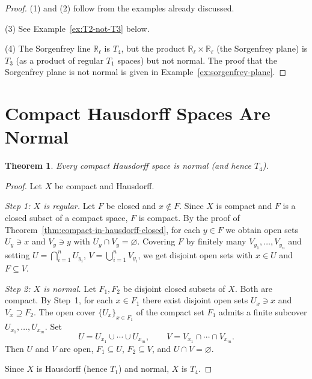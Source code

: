 \documentclass[11pt,a4paper,twoside]{book}
\newtheorem{theorem}{Theorem}[section]
\theoremstyle{remark}
\theoremstyle{definition}
\theoremstyle{definition}
\begin{document}
\begin{proof}
(1) and (2) follow from the examples already discussed.

(3) See Example~\ref{ex:T2-not-T3} below.

(4) The Sorgenfrey line $\mathbb{R}_\ell$ is $T_4$, but the product
$\mathbb{R}_\ell \times \mathbb{R}_\ell$ (the Sorgenfrey plane) is $T_3$
(as a product of regular $T_1$ spaces) but not normal.  The proof that the
Sorgenfrey plane is not normal is given in Example~\ref{ex:sorgenfrey-plane}.
\end{proof}

\section{Compact Hausdorff Spaces Are Normal}
\label{sec:compact-hausdorff-normal}

\begin{theorem}\label{thm:compact-hausdorff-normal}
Every compact Hausdorff space is normal (and hence $T_4$).
\end{theorem}

\begin{proof}
Let $X$ be compact and Hausdorff.

\emph{Step 1: $X$ is regular.}
Let $F$ be closed and $x \notin F$.  Since $X$ is compact and $F$ is a closed
subset of a compact space, $F$ is compact.  By the proof of
Theorem~\ref{thm:compact-in-hausdorff-closed}, for each $y \in F$ we obtain
open sets $U_y \ni x$ and $V_y \ni y$ with $U_y \cap V_y = \varnothing$.
Covering $F$ by finitely many $V_{y_1}, \ldots, V_{y_n}$ and setting
$U = \bigcap_{i=1}^n U_{y_i}$, $V = \bigcup_{i=1}^n V_{y_i}$, we get
disjoint open sets with $x \in U$ and $F \subseteq V$.

\emph{Step 2: $X$ is normal.}
Let $F_1, F_2$ be disjoint closed subsets of $X$.  Both are compact.  By
Step~1, for each $x \in F_1$ there exist disjoint open sets $U_x \ni x$ and
$V_x \supseteq F_2$.  The open cover $\{U_x\}_{x \in F_1}$ of the compact
set $F_1$ admits a finite subcover $U_{x_1}, \ldots, U_{x_m}$.  Set
\[
  U = U_{x_1} \cup \cdots \cup U_{x_m}, \qquad
  V = V_{x_1} \cap \cdots \cap V_{x_m}.
\]
Then $U$ and $V$ are open, $F_1 \subseteq U$, $F_2 \subseteq V$, and
$U \cap V = \varnothing$.

Since $X$ is Hausdorff (hence $T_1$) and normal, $X$ is $T_4$.
\end{proof}
\end{document}
